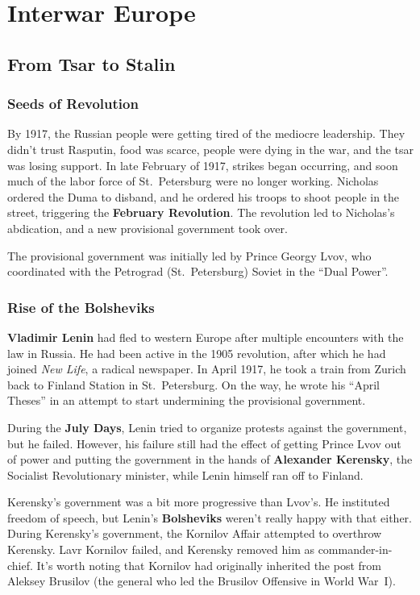 \chapter{Interwar Europe}

\section{From Tsar to Stalin}

\subsection*{Seeds of Revolution}

By 1917, the Russian people were getting tired of the mediocre leadership.
They didn't trust Rasputin, food was scarce, people were dying in the war, and the tsar was losing support.
In late February of 1917, strikes began occurring,
and soon much of the labor force of St.\ Petersburg were no longer working.
Nicholas ordered the Duma to disband, and he ordered his troops to shoot people in the street,
triggering the \textbf{February Revolution}.
The revolution led to Nicholas's abdication, and a new provisional government took over.

The provisional government was initially led by Prince Georgy Lvov,
who coordinated with the Petrograd (St.\ Petersburg) Soviet in the ``Dual Power''.

\subsection*{Rise of the Bolsheviks}

\textbf{Vladimir Lenin} had fled to western Europe after multiple encounters with the law in Russia.
He had been active in the 1905 revolution, after which he had joined \textit{New Life}, a radical newspaper.
In April 1917, he took a train from Zurich back to Finland Station in St.\ Petersburg.
On the way, he wrote his ``April Theses'' in an attempt to start undermining the provisional government.

During the \textbf{July Days}, Lenin tried to organize protests against the government, but he failed.
However, his failure still had the effect of getting Prince Lvov out of power
and putting the government in the hands of \textbf{Alexander Kerensky},
the Socialist Revolutionary minister,
while Lenin himself ran off to Finland.

Kerensky's government was a bit more progressive than Lvov's.
He instituted freedom of speech, but Lenin's \textbf{Bolsheviks} weren't really happy with that either.
During Kerensky's government, the Kornilov Affair attempted to overthrow Kerensky.
Lavr Kornilov failed, and Kerensky removed him as commander-in-chief.
It's worth noting that Kornilov had originally inherited the post from Aleksey Brusilov
(the general who led the Brusilov Offensive in World War~I).

